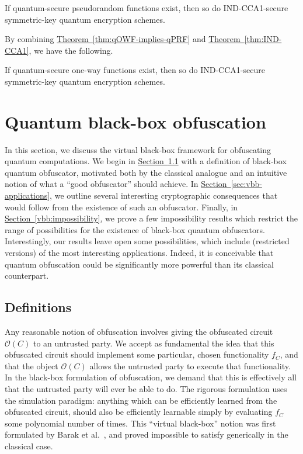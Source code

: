 \documentclass[envcountsame]{llncs}
\numberwithin{equation}{section}
\newcommand{\expref}[2]{\texorpdfstring{\hyperref[#2]{#1~\ref{#2}}}{#1~\ref{#2}}}
\newcommand{\algo}{\mathcal}
\begin{document}
\begin{theorem}\label{thm:IND-CCA1}
If quantum-secure pseudorandom functions exist, then so do IND-CCA1-secure symmetric-key quantum encryption schemes.
\end{theorem}

By combining \expref{Theorem}{thm:qOWF-implies-qPRF} and \expref{Theorem}{thm:IND-CCA1}, we have the following.

\begin{theorem}\label{thm:qOWF-implies-qSKE}
If quantum-secure one-way functions exist, then so do IND-CCA1-secure symmetric-key quantum encryption schemes.
\end{theorem}

\section{Quantum black-box obfuscation}\label{sec:black-box}

In this section, we discuss the virtual black-box framework for obfuscating quantum computations. We begin in \expref{Section}{sec:vbb-definitions} with a definition of black-box quantum obfuscator, motivated both by the classical analogue and an intuitive notion of what a ``good obfuscator'' should achieve. In \expref{Section}{sec:vbb-applications}, we outline several interesting cryptographic consequences that would follow from the existence of such an obfuscator. Finally, in \expref{Section}{vbb:impossibility}, we prove a few impossibility results which restrict the range of possibilities for the existence of black-box quantum obfuscators. Interestingly, our results leave open some possibilities, which include (restricted versions) of the most interesting applications. Indeed, it is conceivable that quantum obfuscation could be significantly more powerful than its classical counterpart.

\subsection{Definitions}\label{sec:vbb-definitions}

Any reasonable notion of obfuscation involves giving the obfuscated circuit $\algo O(C)$ to an untrusted party. We accept as fundamental the idea that this obfuscated circuit should implement some particular, chosen functionality $f_C$, and that the object $\algo O(C)$ allows the untrusted party to execute that functionality. In the black-box formulation of obfuscation, we demand that this is effectively all that the untrusted party will ever be able to do. The rigorous formulation uses the simulation paradigm: anything which can be efficiently learned from the obfuscated circuit, should also be efficiently learnable simply by evaluating $f_C$ some polynomial number of times. This ``virtual black-box'' notion was first formulated by Barak et al.~\cite{BGIRSVY12}, and proved impossible to satisfy generically in the classical case.
\end{document}
